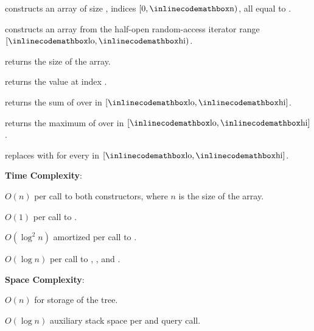 \begin{compactitem}
  \item {} constructs an array of size , indices $[0, {\inlinecodemath{n}})$, all equal to .
  \item {} constructs an array from the half-open random-access iterator range $[{\inlinecodemath{lo}}, {\inlinecodemath{hi}})$.
  \item {} returns the size of the array.
  \item {} returns the value at index .
  \item {} returns the sum of  over  in $[{\inlinecodemath{lo}}, {\inlinecodemath{hi}}]$.
  \item {} returns the maximum of  over  in $[{\inlinecodemath{lo}}, {\inlinecodemath{hi}}]$.
  \item {} replaces  with  for every  in $[{\inlinecodemath{lo}}, {\inlinecodemath{hi}}]$.
\end{compactitem}

\textbf{Time Complexity}:
\begin{compactitem}
  \item $O(n)$ per call to both constructors, where $n$ is the size of the array.
  \item $O(1)$ per call to .
  \item $O(\log^{2} n)$ amortized per call to .
  \item $O(\log n)$ per call to , , and .
\end{compactitem}

\textbf{Space Complexity}:
\begin{compactitem}
  \item $O(n)$ for storage of the tree.
  \item $O(\log n)$ auxiliary stack space per  and query call.
\end{compactitem}

